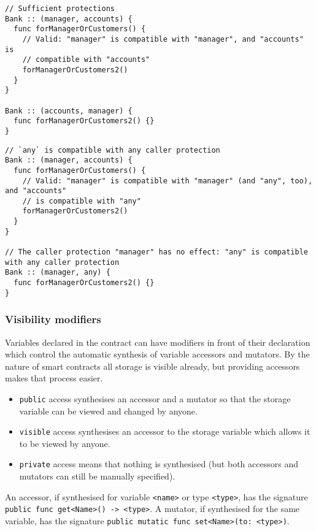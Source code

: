 \begin{verbatim}
// Sufficient protections
Bank :: (manager, accounts) {
  func forManagerOrCustomers() {
    // Valid: "manager" is compatible with "manager", and "accounts" is
    // compatible with "accounts"
    forManagerOrCustomers2()
  }
}

Bank :: (accounts, manager) {
  func forManagerOrCustomers2() {}
}
\end{verbatim}

\begin{verbatim}
// `any` is compatible with any caller protection
Bank :: (manager, accounts) {
  func forManagerOrCustomers() {
    // Valid: "manager" is compatible with "manager" (and "any", too), and "accounts"
    // is compatible with "any"
    forManagerOrCustomers2()
  }
}

// The caller protection "manager" has no effect: "any" is compatible with any caller protection
Bank :: (manager, any) {
  func forManagerOrCustomers2() {}
}
\end{verbatim}

\subsubsection{Visibility modifiers}
\label{sec:appendix-b-visibility-modifiers}

Variables declared in the contract can have modifiers in front of their declaration which control the automatic synthesis of variable accessors and mutators. By the nature of smart contracts all storage is visible already, but providing accessors makes that process easier.

\begin{itemize}
	\item \texttt{public} access synthesises an accessor and a mutator so that the storage variable can be viewed and changed by anyone.
	\item \texttt{visible} access synthesises an accessor to the storage variable which allows it to be viewed by anyone.
	\item \texttt{private} access means that nothing is synthesised (but both accessors and mutators can still be manually specified).
\end{itemize}

An accessor, if synthesised for variable \texttt{<name>} or type \texttt{<type>}, has the signature \texttt{public func get<Name>() -> <type>}. A mutator, if synthesised for the same variable, has the signature \texttt{public mutatic func set<Name>(to: <type>)}.

